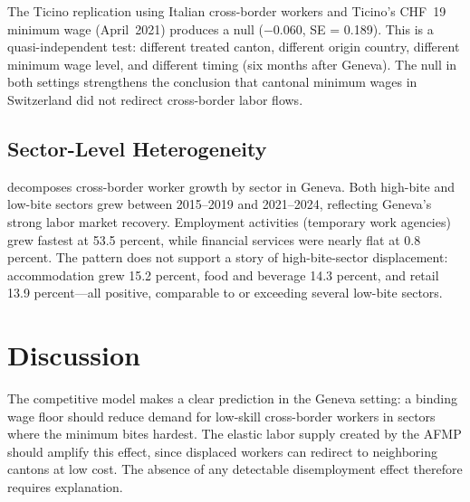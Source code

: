 \documentclass[12pt]{article}
\begin{document}


The Ticino replication using Italian cross-border workers and Ticino's CHF~19 minimum wage (April~2021) produces a null ($-0.060$, SE = 0.189). This is a quasi-independent test: different treated canton, different origin country, different minimum wage level, and different timing (six months after Geneva). The null in both settings strengthens the conclusion that cantonal minimum wages in Switzerland did not redirect cross-border labor flows.

\subsection{Sector-Level Heterogeneity}

 decomposes cross-border worker growth by sector in Geneva. Both high-bite and low-bite sectors grew between 2015--2019 and 2021--2024, reflecting Geneva's strong labor market recovery. Employment activities (temporary work agencies) grew fastest at 53.5 percent, while financial services were nearly flat at 0.8 percent. The pattern does not support a story of high-bite-sector displacement: accommodation grew 15.2 percent, food and beverage 14.3 percent, and retail 13.9 percent---all positive, comparable to or exceeding several low-bite sectors.




\section{Discussion}
\label{sec:discussion}

The competitive model makes a clear prediction in the Geneva setting: a binding wage floor should reduce demand for low-skill cross-border workers in sectors where the minimum bites hardest. The elastic labor supply created by the AFMP should amplify this effect, since displaced workers can redirect to neighboring cantons at low cost. The absence of any detectable disemployment effect therefore requires explanation.
\end{document}
